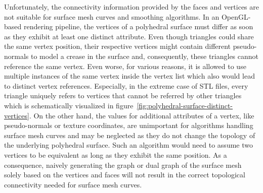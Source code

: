 \documentclass{stdlocal}
\begin{document}
  Unfortunately, the connectivity information provided by the faces and vertices are not suitable for surface mesh curves and smoothing algorithms.
  In an OpenGL-based rendering pipeline, the vertices of a polyhedral surface must differ as soon as they exhibit at least one distinct attribute.
  Even though triangles could share the same vertex position, their respective vertices might contain different pseudo-normals to model a crease in the surface and, consequently, these triangles cannot reference the same vertex.
  Even worse, for various reasons, it is allowed to use multiple instances of the same vertex inside the vertex list which also would lead to distinct vertex references.
  Especially, in the extreme case of STL files, every triangle uniquely refers to vertices that cannot be referred by other triangles which is schematically visualized in figure~\ref{fig:polyhedral-surface-distinct-vertices}.
  On the other hand, the values for additional attributes of a vertex, like pseudo-normals or texture coordinates, are unimportant for algorithms handling surface mesh curves and may be neglected as they do not change the topology of the underlying polyhedral surface.
  Such an algorithm would need to assume two vertices to be equivalent as long as they exhibit the same position.
  As a consequence, naively generating the graph or dual graph of the surface mesh solely based on the vertices and faces will not result in the correct topological connectivity needed for surface mesh curves.
\end{document}
